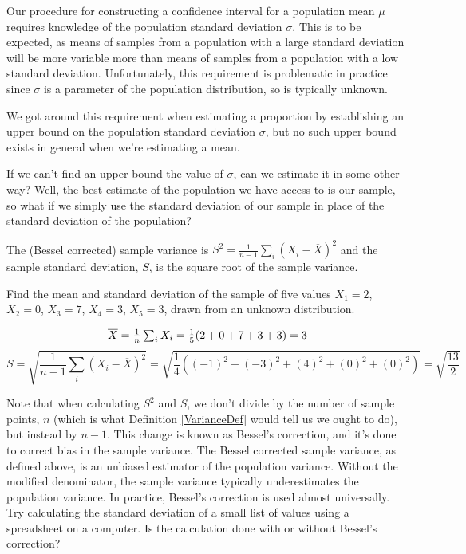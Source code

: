 Our procedure for constructing a confidence interval for a population mean $\mu$ requires knowledge of the population standard deviation $\sigma$. This is to be expected, as means of samples from a population with a large standard deviation will be more variable more than means of samples from a population with a low standard deviation. Unfortunately, this requirement is problematic in practice since $\sigma$ is a parameter of the population distribution, so is typically unknown.
\par
We got around this requirement when estimating a proportion by establishing an upper bound on the population standard deviation $\sigma$, but no such upper bound exists in general when we're estimating a mean.
\par
If we can't find an upper bound the value of $\sigma$, can we estimate it in some other way? Well, the best estimate of the population we have access to is our sample, so what if we simply use the standard deviation of our sample in place of the standard deviation of the population?
\par
\begin{defn}\label{SampleStdDev}The (Bessel corrected) sample variance is $S^2 = \frac{1}{n-1}\sum_{i} (X_i - \overline{X})^2$ and the sample standard deviation, $S$, is the square root of the sample variance.
\end{defn}
\par
\begin{examp} Find the mean and standard deviation of the sample of five values $X_1 = 2$, $X_2 = 0$, $X_3 = 7$, $X_4 = 3$, $X_5 = 3$, drawn from an unknown distribution.

$${\overline{X}} = \textstyle\frac{1}{n}\sum_{i} X_i = \frac{1}{5}(2+0+7+3+3) = 3$$
$$S = \textstyle\sqrt{\frac{1}{n-1}\sum_{i} (X_i - \overline{X})^2} = \textstyle\sqrt{\frac{1}{4}((-1)^2+(-3)^2+(4)^2+(0)^2+(0)^2)} = \textstyle\sqrt{\frac{13}{2}}$$
\end{examp}
\par
Note that when calculating $S^2$ and $S$, we don't divide by the number of sample points, $n$ (which is what Definition \ref{VarianceDef} would tell us we ought to do), but instead by $n-1$. This change is known as Bessel's correction, and it's done to correct bias in the sample variance. The Bessel corrected sample variance, as defined above, is an unbiased estimator of the population variance. Without the modified denominator, the sample variance typically underestimates the population variance. In practice, Bessel's correction is used almost universally. Try calculating the standard deviation of a small list of values using a spreadsheet on a computer. Is the calculation done with or without Bessel's correction?

